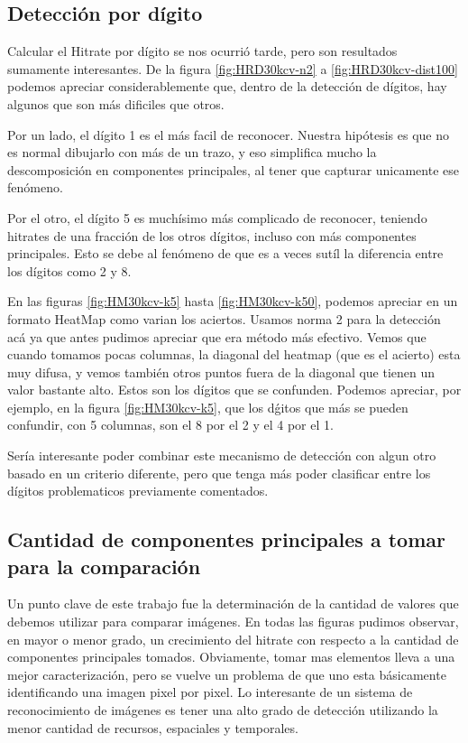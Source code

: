 \subsection{Detecci\'on por d\'igito}
Calcular el Hitrate por d\'igito se nos ocurri\'o tarde, pero son resultados
sumamente interesantes. De la figura \ref{fig:HRD30kcv-n2} a \ref{fig:HRD30kcv-dist100}
podemos apreciar considerablemente que, dentro de
la detecci\'on de d\'igitos, hay algunos que son m\'as dificiles que otros.

Por un lado, el d\'igito 1 es el m\'as facil de reconocer. Nuestra hip\'otesis
es que no es normal dibujarlo con m\'as de un trazo, y eso simplifica mucho la
descomposici\'on en componentes principales, al tener que capturar unicamente ese
fen\'omeno.

Por el otro, el d\'igito 5 es much\'isimo m\'as complicado de reconocer, teniendo
hitrates de una fracci\'on de los otros d\'igitos, incluso con m\'as componentes
principales. Esto se debe al fen\'omeno de que es a veces sut\'il la diferencia
entre los d\'igitos como 2 y 8.

En las figuras \ref{fig:HM30kcv-k5} hasta \ref{fig:HM30kcv-k50}, podemos apreciar
en un formato HeatMap como varian los aciertos. Usamos norma 2 para la detecci\'on ac\'a
ya que antes pudimos apreciar que era m\'etodo m\'as efectivo. Vemos que cuando tomamos pocas
columnas, la diagonal del heatmap (que es el acierto) esta muy difusa, y vemos tambi\'en
otros puntos fuera de la diagonal que tienen un valor bastante alto. Estos son los d\'igitos
que se confunden. Podemos apreciar, por ejemplo, en la figura \ref{fig:HM30kcv-k5}, que
los d\'gitos que m\'as se pueden confundir, con 5 columnas, son el 8 por el 2 y el 4 por el 1.

Ser\'ia interesante poder combinar este mecanismo de detecci\'on con algun otro basado en un
criterio diferente, pero que tenga m\'as poder clasificar entre los d\'igitos problematicos
previamente comentados.


\subsection{Cantidad de componentes principales a tomar para la comparaci\'on}
Un punto clave de este trabajo fue la determinaci\'on de la cantidad de valores que debemos
utilizar para comparar im\'agenes. En todas las figuras pudimos observar, en mayor o menor
grado, un crecimiento del hitrate con respecto a la cantidad de componentes principales tomados.
Obviamente, tomar mas elementos lleva a una mejor caracterizaci\'on, pero se vuelve un problema
de que uno esta b\'asicamente identificando una imagen pixel por pixel. Lo interesante de un
sistema de reconocimiento de im\'agenes es tener una alto grado de detecci\'on utilizando la menor
cantidad de recursos, espaciales y temporales.


